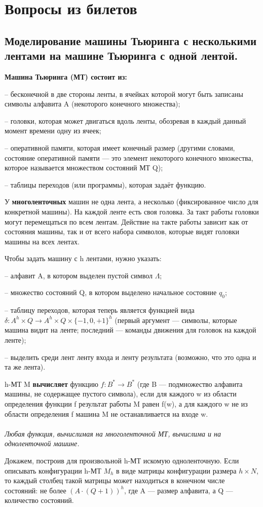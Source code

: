 \section{Вопросы из билетов}

\subsection{Моделирование машины Тьюринга с несколькими лентами на машине Тьюринга с одной лентой.}
\textbf{Машина Тьюринга (МТ) состоит из:} \par
– бесконечной в две стороны ленты, в ячейках которой могут быть записаны символы
алфавита A (некоторого конечного множества);\par
– головки, которая может двигаться вдоль ленты, обозревая в каждый данный момент
времени одну из ячеек;\par
– оперативной памяти, которая имеет конечный размер (другими словами, состояние оперативной памяти — это элемент некоторого конечного множества, которое называется
множеством состояний МТ Q);\par
– таблицы переходов (или программы), которая задаёт функцию.

У \textbf{многоленточных} машин не одна лента, а несколько (фиксированное число для конкретной машины). На каждой ленте есть своя головка. За такт работы головки могут перемещаться по всем лентам. Действие на такте работы зависит как от состояния машины, так и от всего набора символов, которые видят головки машины на всех лентах.\par
Чтобы задать машину с h лентами, нужно указать:\par
– алфавит A, в котором выделен пустой символ $\Lambda$;\par
– множество состояний Q, в котором выделено начальное состояние $q_0$; \par
– таблицу переходов, которая теперь является функцией вида
$\delta : A^h \times Q \rightarrow A^h \times Q \times \{-1, 0, +1\}^h$
(первый аргумент — символы, которые машина видит на ленте; последний — команды
движения для головок на каждой ленте); \par
– выделить среди лент ленту входа и ленту результата (возможно, что это одна и та же
лента).

h-МТ M \textbf{вычисляет} функцию $f : B^* \rightarrow B^*$
(где B — подмножество алфавита машины, не содержащее пустого символа), если для каждого w из области определения функции f результат работы M равен f(w), а для каждого w не из области определения f машина M не останавливается на входе w. \\
\\
\emph{Любая функция, вычислимая на многоленточной МТ, вычислима и на одноленточной машине.} \par
Докажем, построив для произвольной h-МТ искомую одноленточную. Если описывать конфигурации h-МТ $M_h$ в виде матрицы конфигурации размера $h \times N$, то каждый столбец такой матрицы может находиться в конечном числе состояний: не более $(A \cdot (Q + 1))^h$, где A — размер алфавита, а Q — количество состояний.

